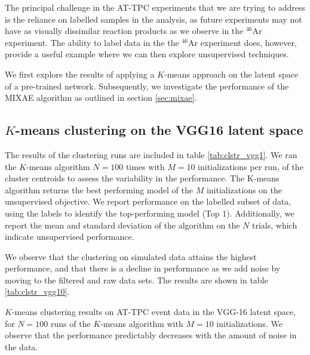 \documentclass[review,sort&compress]{elsarticle}
\begin{document}
The principal challenge in the AT-TPC experiments that we are trying to address is the reliance on labelled samples in the analysis, as future experiments may not have as visually dissimilar reaction products as we observe in the ${}^{46}$Ar experiment.  The ability to label data in the the ${}^{46}$Ar experiment does, however, provide a useful example where we can then explore unsupervised techniques. 

We first explore the results of applying a $K$-means approach on the latent space of a pre-trained network. Subsequently, we investigate the performance of the MIXAE algorithm as outlined in section \ref{sec:mixae}.

\subsection{$K$-means clustering on the VGG16 latent space}\label{sec:kmeans_results}

The results of the clustering runs are included in table \ref{tab:clstr_vgg1}. We ran the $K$-means algorithm $N=100$ times with $M=10$ initializations per run, of the cluster centroids to assess the variability in the performance. The K-means algorithm returns the best performing model of the $M$ initializations on the unsupervised objective. We report performance on the labelled subset of data, using the labels to identify the top-performing model (Top 1). Additionally, we report the mean and standard deviation of the algorithm on the $N$ trials, which indicate unsupervised performance.   


We observe that the clustering on simulated data attains the highest performance, and that there is a decline in performance as we add noise by moving to the filtered and raw data sets. The results are shown in table \ref{tab:clstr_vgg10}. 

\begin{table}[H]
\centering 
\caption[$K$-means on pre-trained model]{$K$-means clustering results on AT-TPC event data in the VGG-16 latent space, for $N=100$ runs of the $K$-means algorithm with $M=10$ initializations. We observe that the performance predictably decreases with the amount of noise in the data.}\label{tab:clstr_vgg10}

\end{table}
\end{document}
